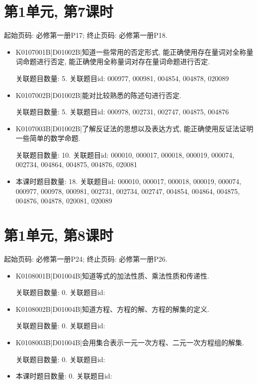 \section*{第1单元, 第7课时}
起始页码: 必修第一册P17; 终止页码: 必修第一册P18.
\begin{itemize}
\item K0107001B|D01002B|知道一些常用的否定形式, 能正确使用存在量词对全称量词命题进行否定, 能正确使用全称量词对存在量词命题进行否定.

关联题目数量: 5. 关联题目id: 000977, 000981, 004854, 004878, 020089

\item K0107002B|D01002B|能对比较熟悉的陈述句进行否定.

关联题目数量: 5. 关联题目id: 000978, 002731, 002747, 004875, 004876

\item K0107003B|D01002B|了解反证法的思想以及表达方式, 能正确使用反证法证明一些简单的数学命题.

关联题目数量: 10. 关联题目id: 000010, 000017, 000018, 000019, 000074, 002734, 004864, 004875, 004876, 020081

\item 本课时题目数量: 18. 关联题目id: 000010, 000017, 000018, 000019, 000074, 000977, 000978, 000981, 002731, 002734, 002747, 004854, 004864, 004875, 004876, 004878, 020081, 020089

\end{itemize}

\section*{第1单元, 第8课时}
起始页码: 必修第一册P24; 终止页码: 必修第一册P26.
\begin{itemize}
\item K0108001B|D01004B|知道等式的加法性质、乘法性质和传递性.

关联题目数量: 0. 关联题目id: 

\item K0108002B|D01004B|知道方程、方程的解、方程的解集的定义.

关联题目数量: 0. 关联题目id: 

\item K0108003B|D01004B|会用集合表示一元一次方程、二元一次方程组的解集.

关联题目数量: 0. 关联题目id: 

\item 本课时题目数量: 0. 关联题目id: 

\end{itemize}

